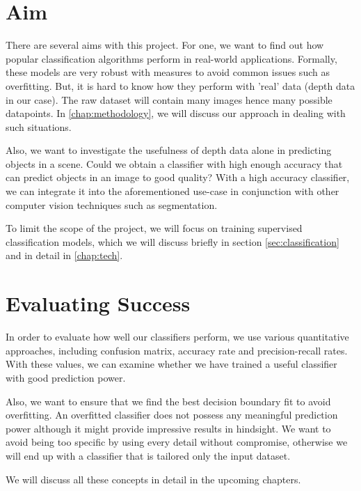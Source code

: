 \section{Aim}
There are several aims with this project. For one, we want to find out how popular classification algorithms perform in real-world applications. Formally, these models are very robust with measures to avoid common issues such as overfitting. But, it is hard to know how they perform with 'real' data (depth data in our case). The raw dataset will contain many images hence many possible datapoints. In \autoref{chap:methodology}, we will discuss our approach in dealing with such situations.

Also, we want to investigate the usefulness of depth data alone in predicting objects in a scene. Could we obtain a classifier with high enough accuracy that can predict objects in an image to good quality? With a high accuracy classifier, we can integrate it into the aforementioned use-case in conjunction with other computer vision techniques such as segmentation. 

To limit the scope of the project, we will focus on training supervised classification models, which we will discuss briefly in section \ref{sec:classification} and in detail in \autoref{chap:tech}.

\section{Evaluating Success}
In order to evaluate how well our classifiers perform, we use various quantitative approaches, including confusion matrix, accuracy rate and precision-recall rates. With these values, we can examine whether we have trained a useful classifier with good prediction power. 

Also, we want to ensure that we find the best decision boundary fit to avoid overfitting. An overfitted classifier does not possess any meaningful prediction power although it might provide impressive results in hindsight. We want to avoid being too specific by using every detail without compromise, otherwise we will end up with a classifier that is tailored only the input dataset. 

We will discuss all these concepts in detail in the upcoming chapters.
